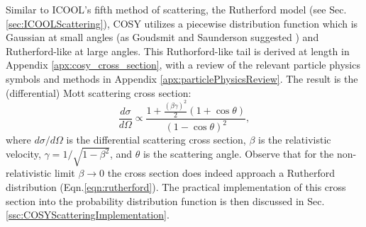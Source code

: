%
%
 \label{sec:COSYScattering}\par
Similar to ICOOL's fifth method of scattering, the Rutherford model (see Sec. \ref{sec:ICOOLScattering}), COSY utilizes a piecewise distribution function which is Gaussian  at small angles (as Goudsmit and Saunderson suggested \cite{gs}) and Rutherford-like at large angles. This Ruthorford-like tail is derived at length in Appendix \ref{apx:cosy_cross_section}, with a review of the relevant particle physics symbols and methods in Appendix \ref{apx:particlePhysicsReview}. The result is the (differential) Mott scattering cross section:
\begin{equation}\label{eqn:MottCrossSection}
\frac{d\sigma}{d\Omega} \propto \frac{1+\frac{(\beta\gamma)^2}{2} (1+\cos\theta)  }{(1-\cos\theta)^2},
\end{equation}
where $d\sigma/d\Omega$ is the differential scattering cross section, $\beta$ is the relativistic velocity, $\gamma=1/\sqrt{1-\beta^2}$, and $\theta$ is the scattering angle. Observe that for the non-relativistic limit $\beta\rightarrow 0$ the cross section does indeed approach a Rutherford distribution (Eqn.\ref{eqn:rutherford}). The practical implementation of this cross section into the probability distribution function is then discussed in Sec. \ref{ssc:COSYScatteringImplementation}.

